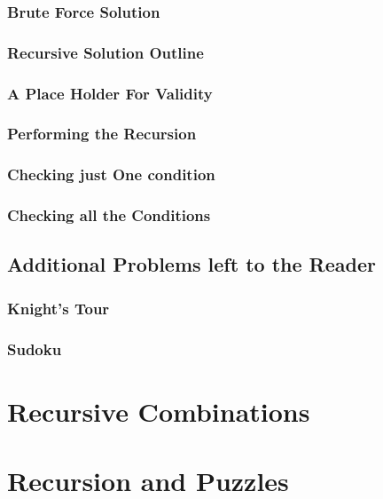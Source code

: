 \documentclass[10pt,a4paper]{book}
\begin{document}
\subsubsection{Brute Force Solution}

\subsubsection{Recursive Solution Outline}

\subsubsection{A Place Holder For Validity}

\subsubsection{Performing the Recursion}

\subsubsection{Checking just One condition}


\subsubsection{Checking all the Conditions}




\subsection{Additional Problems left to the Reader}

\subsubsection{Knight's Tour}

\subsubsection{Sudoku}




\section{Recursive Combinations}



\section{Recursion and Puzzles}
\end{document}
